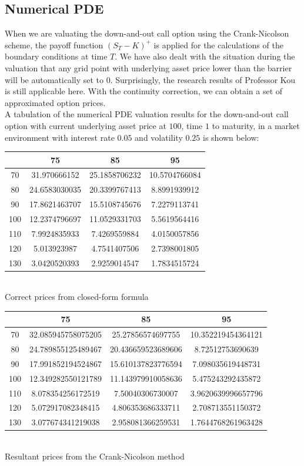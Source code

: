 \subsection{Numerical PDE}
When we are valuating the down-and-out call option using the Crank-Nicolson scheme, the payoff function $(S_{T} - K)^{+}$ is applied for the calculations of the boundary conditions at time $T$. We have also dealt with the situation during the valuation that any grid point with underlying asset price lower than the barrier will be automatically set to $0$. Surprisingly, the research results of Professor Kou\cite{ContinuityCorrection} is still applicable here. With the continuity correction, we can obtain a set of approximated option prices.\\[1mm]
A tabulation of the numerical PDE valuation results for the down-and-out call option with current underlying asset price at $100$, time $1$ to maturity, in a market environment with interest rate $0.05$ and volatility $0.25$ is shown below:
\begin{center}
\begin{tabular}{|c|c|c|c|}
\hline 
 & 75 & 85 & 95\\
\hline
70&31.970666152&25.1858706232&10.5704766084\\
80&24.6583030035&20.3399767413&8.8991939912\\
90&17.8621463707&15.5108745676&7.2279113741\\
100&12.2374796697&11.0529331703&5.5619564416\\
110&7.9924835933&7.4269559884&4.0150057856\\
120&5.013923987&4.7541407506&2.7398001805\\
130&3.0420520393&2.9259014547&1.7834515724\\
\hline
\end{tabular}
\\[1mm]Correct prices from closed-form formula
\\[3mm]
\begin{tabular}{|c|c|c|c|}
\hline
 & 75 & 85 & 95\\
\hline
70&32.085945758075205&25.27856574697755&10.352219454364121\\
80&24.789855125489467&20.436659523689606&8.72512753690639\\
90&17.991852194524867&15.610137823776594&7.098035619448731\\
100&12.349282550121789&11.143979910058636&5.475243292435872\\
110&8.078354256172519&7.50040306730007&3.9620639996657796\\
120&5.072917082348415&4.806353686333711&2.708713551150372\\
130&3.077674341219038&2.958081366259531&1.7644768261963428\\
\hline
\end{tabular}
\\[1mm] Resultant prices from the Crank-Nicolson method
\end{center}
